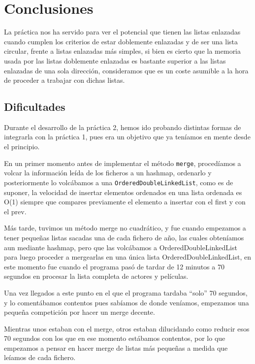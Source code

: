 \documentclass[a4paper,11pt]{report}
\begin{document}
\chapter{Conclusiones}
La práctica nos ha servido para ver el potencial que tienen las listas enlazadas cuando cumplen los criterios de estar doblemente enlazadas y de ser una lista circular, frente a listas enlazadas más simples, si bien es cierto que la memoria usada por las listas doblemente enlazadas es bastante superior a las listas enlazadas de una sola dirección, consideramos que es un coste asumible a la hora de proceder a trabajar con dichas listas.

\section{\label{dificultades}Dificultades}

Durante el desarrollo de la práctica 2, hemos ido probando distintas formas de integrarla con la práctica 1, pues era un objetivo que ya teníamos en mente desde el principio.

En un primer momento antes de implementar el método \texttt{merge}, procedíamos a volcar la información leída de los ficheros a un hashmap, ordenarlo y posteriormente lo volcábamos a una \texttt{OrderedDoubleLinkedList}, como es de suponer, la velocidad de insertar elementos ordenados en una lista ordenada es O(1) siempre que compares previamente el elemento a insertar con el first y con el prev.

Más tarde, tuvimos un método merge no cuadrático, y fue cuando empezamos a tener pequeñas listas sacadas una de cada fichero de año, las cuales obteníamos aun mediante hashmap, pero que las volcábamos a OrderedDoubleLinkedList para luego proceder a mergearlas en una única lista OrderedDoubleLinkedList, en este momento fue cuando el programa pasó de tardar de 12 minutos a 70 segundos en procesar la lista completa de actores y películas.

Una vez llegados a este punto en el que el programa tardaba \textquotedblleft solo\textquotedblright{} 70 segundos, y lo comentábamos contentos pues sabíamos de donde veníamos, empezamos una pequeña competición por hacer un merge decente.

Mientras unos estaban con el merge, otros estaban dilucidando como reducir esos 70 segundos con los que en ese momento estábamos contentos, por lo que empezamos a pensar en hacer merge de listas más pequeñas a medida que leíamos de cada fichero.
\end{document}
